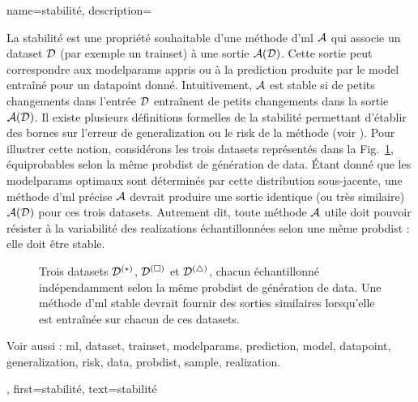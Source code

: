 {name={stabilité},
	description={La stabilité est une propriété souhaitable d’une méthode d’\gls{ml} $\mathcal{A}$ 
		qui associe un \gls{dataset} $\mathcal{D}$ (par exemple un \gls{trainset}) à une sortie $\mathcal{A}(\mathcal{D})$. 
		Cette sortie peut correspondre aux \gls{modelparams} appris ou à la \gls{prediction} produite par 
		le \gls{model} entraîné pour un \gls{datapoint} donné. Intuitivement, $\mathcal{A}$ est stable si 
		de petits changements dans l’entrée $\mathcal{D}$ entraînent de petits changements dans la sortie 
		$\mathcal{A}(\mathcal{D})$. Il existe plusieurs définitions formelles de la stabilité permettant d’établir 
		des bornes sur l’erreur de \gls{generalization} ou le \gls{risk} de la méthode (voir \cite[Ch.~13]{ShalevMLBook}).
		Pour illustrer cette notion, considérons les trois \glspl{dataset} représentés dans la 
		Fig.~\ref{fig_three_data_stability_dict}, équiprobables selon la même \gls{probdist} de génération de \gls{data}. Étant donné que les \gls{modelparams} optimaux sont déterminés par cette distribution 
		sous-jacente, une méthode d’\gls{ml} précise $\mathcal{A}$ devrait produire une sortie identique (ou très 
		similaire) $\mathcal{A}(\mathcal{D})$ pour ces trois \glspl{dataset}. Autrement dit, toute méthode 
		$\mathcal{A}$ utile doit pouvoir résister à la variabilité des \glspl{realization} échantillonnées selon une même 
		\gls{probdist} : elle doit être stable.
		\begin{figure}[H]
			\centering
			\caption{Trois \glspl{dataset} $\mathcal{D}^{(*)}$, $\mathcal{D}^{(\square)}$ et $\mathcal{D}^{(\triangle)}$, 
				chacun échantillonné indépendamment selon la même \gls{probdist} de génération de \gls{data}. 
				Une méthode d’\gls{ml} stable devrait fournir des sorties similaires lorsqu’elle est entraînée sur 
				chacun de ces \glspl{dataset}. \label{fig_three_data_stability_dict}}
		\end{figure}		
		Voir aussi : \gls{ml}, \gls{dataset}, \gls{trainset}, \gls{modelparams}, \gls{prediction}, \gls{model}, \gls{datapoint}, \gls{generalization}, \gls{risk}, \gls{data}, \gls{probdist}, \gls{sample}, \gls{realization}.}, 
	first={stabilité}, 
	text={stabilité} 
}

